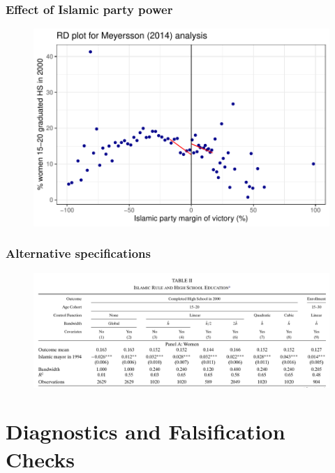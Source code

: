 \documentclass[12pt,english,dvipsnames,aspectratio=169,handout]{beamer}\usepackage[]{graphicx}\usepackage[]{xcolor}
\begin{document}
\begin{frame}[fragile]
\frametitle{Effect of Islamic party power}



\begin{figure}
\centering
\includegraphics[scale=0.7]{../04-figures/07/11.pdf}
\end{figure}

\end{frame}


\begin{frame}
\frametitle{Alternative specifications}

\begin{figure}
\centering
\includegraphics[scale=0.4]{../04-figures/07/12.PNG}
\end{figure}

\end{frame}


\section{Diagnostics and Falsification Checks}
\end{document}

